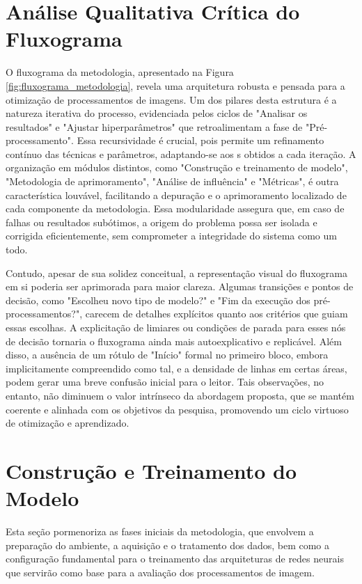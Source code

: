 \section{Análise Qualitativa Crítica do Fluxograma}

O fluxograma da metodologia, apresentado na Figura \ref{fig:fluxograma_metodologia}, revela uma arquitetura robusta e pensada para a otimização de processamentos de imagens. Um dos pilares desta estrutura é a natureza iterativa do processo, evidenciada pelos ciclos de "Analisar os resultados" e "Ajustar hiperparâmetros" que retroalimentam a fase de "Pré-processamento". Essa recursividade é crucial, pois permite um refinamento contínuo das técnicas e parâmetros, adaptando-se aos s obtidos a cada iteração. A organização em módulos distintos, como "Construção e treinamento de modelo", "Metodologia de aprimoramento", "Análise de influência" e "Métricas", é outra característica louvável, facilitando a depuração e o aprimoramento localizado de cada componente da metodologia. Essa modularidade assegura que, em caso de falhas ou resultados subótimos, a origem do problema possa ser isolada e corrigida eficientemente, sem comprometer a integridade do sistema como um todo.

Contudo, apesar de sua solidez conceitual, a representação visual do fluxograma em si poderia ser aprimorada para maior clareza. Algumas transições e pontos de decisão, como "Escolheu novo tipo de modelo?" e "Fim da execução dos pré-processamentos?", carecem de detalhes explícitos quanto aos critérios que guiam essas escolhas. A explicitação de limiares ou condições de parada para esses nós de decisão tornaria o fluxograma ainda mais autoexplicativo e replicável. Além disso, a ausência de um rótulo de "Início" formal no primeiro bloco, embora implicitamente compreendido como tal, e a densidade de linhas em certas áreas, podem gerar uma breve confusão inicial para o leitor. Tais observações, no entanto, não diminuem o valor intrínseco da abordagem proposta, que se mantém coerente e alinhada com os objetivos da pesquisa, promovendo um ciclo virtuoso de otimização e aprendizado.

\section{Construção e Treinamento do Modelo}

Esta seção pormenoriza as fases iniciais da metodologia, que envolvem a preparação do ambiente, a aquisição e o tratamento dos dados, bem como a configuração fundamental para o treinamento das arquiteturas de redes neurais que servirão como base para a avaliação dos processamentos de imagem.

